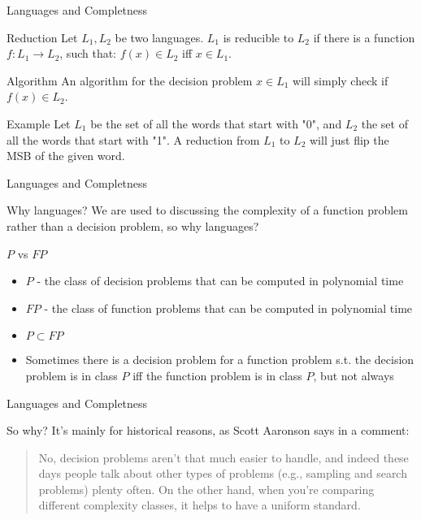 \documentclass[leqno,fleqn]{beamer}
\begin{document}
\begin{frame}[label={sec:orgheadline4}]{Languages and Completness}
\begin{block}{Reduction}
Let \(L_{1}, L_{2}\) be two languages. \(L_1\) is reducible to \(L_2\) if there is a
function \(f:L_1 \rightarrow L_2\), such that:
\(f(x) \in L_{2}\) iff \(x \in L_{1}\).
\end{block}
\begin{block}{Algorithm}
An algorithm for the decision problem \(x \in L_{1}\) will simply check if \(f(x) \in L_{2}\).
\end{block}
\begin{block}{Example}
Let \(L_{1}\) be the set of all the words that start with "0", and \(L_{2}\) the set of all the words that start with "1". A reduction from \(L_{1}\) to \(L_{2}\) will just flip the MSB of the given word.
\end{block}
\end{frame}
\begin{frame}[label={sec:orgheadline5}]{Languages and Completness}
\begin{block}{Why languages?}
We are used to discussing the complexity of a \alert{function problem} rather than a \alert{decision problem}, so why languages?
\end{block}
\begin{block}{\(P\) vs \(FP\)}
\begin{itemize}
\item \(P\) - the class of decision problems that can be computed in polynomial time
\item \(FP\) - the class of function problems that can be computed in polynomial time
\item \(P \subset FP\)
\item Sometimes there is a decision problem for a function problem s.t. the decision problem is in class \(P\) iff the function problem is in class \(P\), but not always
\end{itemize}
\end{block}
\end{frame}
\begin{frame}[label={sec:orgheadline6}]{Languages and Completness}
\begin{block}{So why?}
It's mainly for historical reasons, as Scott Aaronson says in a comment:
\begin{quote}
No, decision problems aren’t that much easier to handle, and indeed these days people talk about other types of problems (e.g., sampling and search problems) plenty often. On the other hand, when you’re comparing different complexity classes, it helps to have a uniform standard.
\end{quote}
\end{block}
\end{frame}
\end{document}
